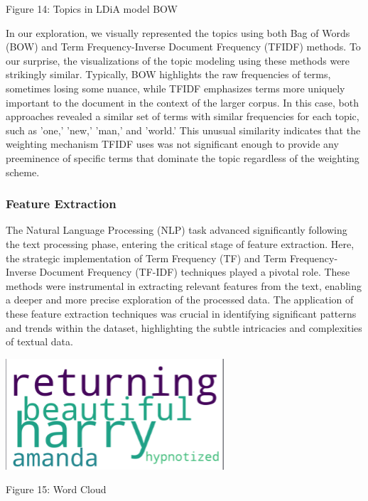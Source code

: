 \documentclass{article}
\begin{document}
\begin{multicols}{2}
{\small
  Figure 14: Topics in LDiA model BOW
  \par
  \vspace{6pt}
}

In our exploration, we visually represented the topics using both Bag of Words (BOW) and Term Frequency-Inverse Document Frequency (TFIDF) methods. To our surprise, the visualizations of the topic modeling using these methods were strikingly similar. Typically, BOW highlights the raw frequencies of terms, sometimes losing some nuance, while TFIDF emphasizes terms more uniquely important to the document in the context of the larger corpus. In this case, both approaches revealed a similar set of terms with similar frequencies for each topic, such as 'one,' 'new,' 'man,' and 'world.' This unusual similarity indicates that the weighting mechanism TFIDF uses was not significant enough to provide any preeminence of specific terms that dominate the topic regardless of the weighting scheme.

\subsubsection{Feature Extraction}

The Natural Language Processing (NLP) task advanced significantly following the text processing phase, entering the critical stage of feature extraction. Here, the strategic implementation of Term Frequency (TF) and Term Frequency-Inverse Document Frequency (TF-IDF) techniques played a pivotal role. These methods were instrumental in extracting relevant features from the text, enabling a deeper and more precise exploration of the processed data. The application of these feature extraction techniques was crucial in identifying significant patterns and trends within the dataset, highlighting the subtle intricacies and complexities of textual data.
\par
\vspace{6pt}

\includegraphics[scale=.7]{img/nlp3.png}

{\small
  Figure 15: Word Cloud
  \par
  \vspace{6pt}
}


\end{multicols}
\end{document}
